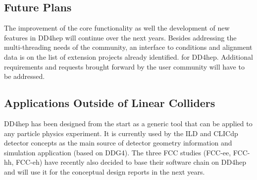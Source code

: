 \subsection{Future Plans}
The improvement of the core functionality as well the development of new features in DD4hep will continue over the next years. Besides addressing the multi-threading needs of the community, an interface to conditions and alignment data is on the list of extension projects already identified. for DD4hep. Additional requirements and requests brought forward by the user community will have to be addressed.

\subsection{Applications Outside of Linear Colliders}
DD4hep has been designed from the start as a generic tool that can be applied to any particle physics experiment. It is currently used by the ILD and CLICdp detector concepts as the main source of detector geometry information and simulation application (based on DDG4). The three FCC studies (FCC-ee, FCC-hh, FCC-eh) have recently also decided to base their software chain on DD4hep and will use it for the conceptual design reports in the next years.
